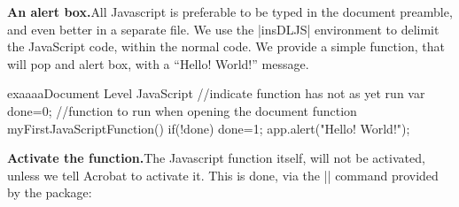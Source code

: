 \begin{multicols}{2}
\textbf{An alert box.}\quad All Javascript is preferable to be typed in the document preamble, and even better in 
a separate file. We use the |insDLJS| environment to delimit the JavaScript code, within 
the normal \latex code. We provide a simple function, that will pop and alert box, with
a ``Hello! World!'' message. 
\end{multicols}
\begin{teXXX}
\begin{insDLJS}[exaaaa]{exaaaa}{Document Level JavaScript}
//indicate function has not as yet run
var done=0;
//function to run when opening the document
function myFirstJavaScriptFunction()
{
  if(!done){
    done=1;
    app.alert("Hello! World!");
  } 
}
\end{insDLJS}
\end{teXXX}
\begin{multicols}{2}
\textbf{Activate the function.}\quad The Javascript function itself, will not be activated, unless we tell Acrobat to activate it. This is done, via the
|\OpenAction| command provided by the package:
\end{multicols}
